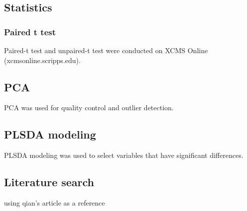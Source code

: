 \subsection{Statistics}
\subsubsection{Paired t test}
Paired-t test and unpaired-t test were conducted on XCMS Online (xcmsonline.scripps.edu).

\subsection{PCA}
PCA was used for quality control and outlier detection.

\subsection{PLSDA modeling}
PLSDA modeling was used to select variables that have significant differences. 

\subsection{Literature search}
using qian's article as a reference

